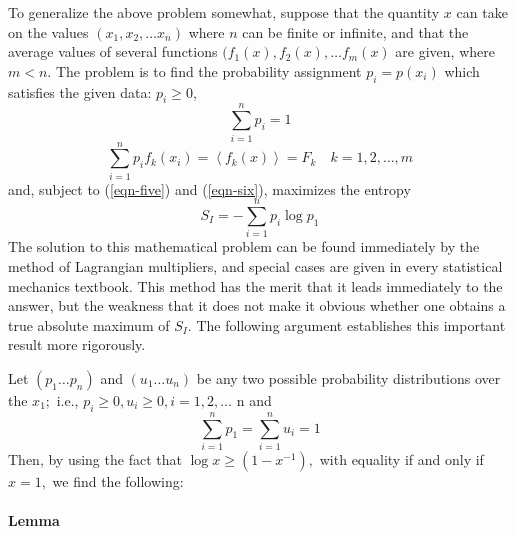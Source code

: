 \documentclass[]{article}
\begin{document}
To generalize the above problem somewhat, suppose that the quantity
\(x\) can take on the values \((x_1, x_2, \dots x_n)\) where $n$ can be finite or
infinite, and that the average values of several functions $(f_1(x), f_2(x), \dots f_m(x)$ are given, where $m < n$. The problem is to find the probability assignment $p_i =
p(x_i)$ which satisfies the given data: $p_i \geq 0$,
%
\begin{equation}
\sum_{i = 1}^{n} p_{i} = 1 \label{eqn-five}
\end{equation}
\begin{equation}
\sum_{i = 1}^{n}  p_{i}f_{k}\left( x_{i} \right) = \left\langle f_{k}(x) \right\rangle = F_{k} \quad k = 1,2,\ldots,m \label{eqn-six}
\end{equation}
%
and, subject to (\ref{eqn-five}) and (\ref{eqn-six}), maximizes the entropy
%
\begin{equation}
S_{I} = - \sum_{i = 1}^{n} p_{i}\log p_{1} \label{eqn-seven}
\end{equation}
%
The solution to this mathematical problem can be found immediately by
the method of Lagrangian multipliers, and special cases are given in
every statistical mechanics textbook. This method has the merit that it
leads immediately to the answer, but the weakness that it does not make
it obvious whether one obtains a true absolute maximum of \(S_{I}\). The
following argument establishes this important result more rigorously.

Let \(\left( p_{1}\ldots p_{n} \right)\) and
\(\left( u_{1}\ldots u_{n} \right)\) be any two possible probability
distributions over the \(x_{1};\) i.e.,
\(p_{i} \geq 0,u_{i} \geq 0,i = 1,2,\ldots\) n and
%
\begin{equation}
\sum_{i = 1}^{n} p_{1} = \sum_{i = 1}^{n} u_{i} = 1
\end{equation}
%
Then, by using the fact that
\(\log x \geq \left( 1 - x^{- 1} \right),\) with equality if and only if
\(x = 1,\) we find the following:

\paragraph{Lemma}
\end{document}
